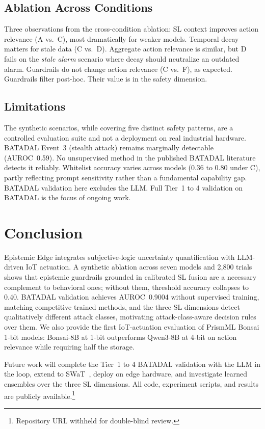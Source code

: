 \documentclass[conference]{IEEEtran}
\begin{document}
\subsection{Ablation Across Conditions}

Three observations from the cross-condition ablation:
SL context improves action relevance (A vs.\ C), most dramatically for weaker models.
Temporal decay matters for stale data (C vs.\ D). Aggregate action relevance is similar, but D fails on the \textit{stale alarm} scenario where decay should neutralize an outdated alarm.
Guardrails do not change action relevance (C vs.\ F), as expected. Guardrails filter post-hoc. Their value is in the safety dimension.

\subsection{Limitations}

The synthetic scenarios, while covering five distinct safety patterns, are a controlled evaluation suite and not a deployment on real industrial hardware.
BATADAL Event~3 (stealth attack) remains marginally detectable (AUROC~0.59). No unsupervised method in the published BATADAL literature detects it reliably.
Whitelist accuracy varies across models (0.36 to 0.80 under C), partly reflecting prompt sensitivity rather than a fundamental capability gap.
BATADAL validation here excludes the LLM. Full Tier~1 to 4 validation on BATADAL is the focus of ongoing work.

\section{Conclusion}

Epistemic Edge integrates subjective-logic uncertainty quantification with LLM-driven IoT actuation. A synthetic ablation across seven models and 2{,}800 trials shows that epistemic guardrails grounded in calibrated SL fusion are a necessary complement to behavioral ones; without them, threshold accuracy collapses to 0.40. BATADAL validation achieves AUROC~0.9004 without supervised training, matching competitive trained methods, and the three SL dimensions detect qualitatively different attack classes, motivating attack-class-aware decision rules over them. We also provide the first IoT-actuation evaluation of PrismML Bonsai 1-bit models: Bonsai-8B at 1-bit outperforms Qwen3-8B at 4-bit on action relevance while requiring half the storage.

Future work will complete the Tier~1 to 4 BATADAL validation with the LLM in the loop, extend to SWaT~\cite{goh2017swat}, deploy on edge hardware, and investigate learned ensembles over the three SL dimensions. All code, experiment scripts, and results are publicly available.\footnote{Repository URL withheld for double-blind review.}

\balance


\end{document}
